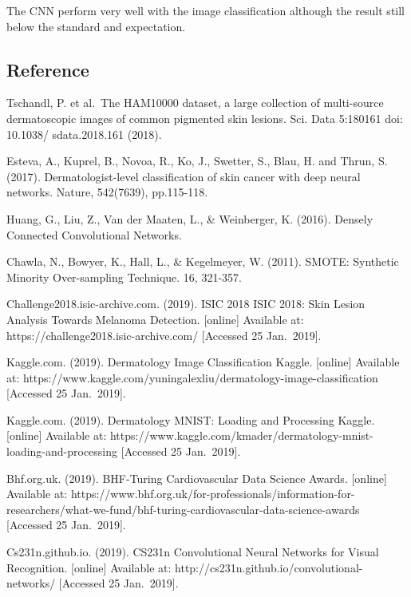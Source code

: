 \documentclass[11pt]{article}
\begin{document}
The CNN perform very well with the image classification although the
result still below the standard and expectation.

    \hypertarget{reference}{%
\subsection{Reference}\label{reference}}

Tschandl, P. et al.~The HAM10000 dataset, a large collection of
multi-source dermatoscopic images of common pigmented skin lesions. Sci.
Data 5:180161 doi: 10.1038/ sdata.2018.161 (2018).

Esteva, A., Kuprel, B., Novoa, R., Ko, J., Swetter, S., Blau, H. and
Thrun, S. (2017). Dermatologist-level classification of skin cancer with
deep neural networks. Nature, 542(7639), pp.115-118.

Huang, G., Liu, Z., Van der Maaten, L., \& Weinberger, K. (2016).
Densely Connected Convolutional Networks.

Chawla, N., Bowyer, K., Hall, L., \& Kegelmeyer, W. (2011). SMOTE:
Synthetic Minority Over-sampling Technique. 16, 321-357.

Challenge2018.isic-archive.com. (2019). ISIC 2018 \textbar{} ISIC 2018:
Skin Lesion Analysis Towards Melanoma Detection. {[}online{]} Available
at: https://challenge2018.isic-archive.com/ {[}Accessed 25 Jan.~2019{]}.

Kaggle.com. (2019). Dermatology Image Classification \textbar{} Kaggle.
{[}online{]} Available at:
https://www.kaggle.com/yuningalexliu/dermatology-image-classification
{[}Accessed 25 Jan.~2019{]}.

Kaggle.com. (2019). Dermatology MNIST: Loading and Processing \textbar{}
Kaggle. {[}online{]} Available at:
https://www.kaggle.com/kmader/dermatology-mnist-loading-and-processing
{[}Accessed 25 Jan.~2019{]}.

Bhf.org.uk. (2019). BHF-Turing Cardiovascular Data Science Awards.
{[}online{]} Available at:
https://www.bhf.org.uk/for-professionals/information-for-researchers/what-we-fund/bhf-turing-cardiovascular-data-science-awards
{[}Accessed 25 Jan.~2019{]}.

Cs231n.github.io. (2019). CS231n Convolutional Neural Networks for
Visual Recognition. {[}online{]} Available at:
http://cs231n.github.io/convolutional-networks/ {[}Accessed 25
Jan.~2019{]}.


    
    
    
    
\end{document}
